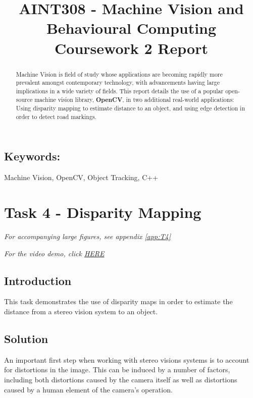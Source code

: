 \documentclass[conference]{IEEEtran}
\begin{document}
%
\title{AINT308 - Machine Vision and Behavioural Computing\\Coursework 2 Report}


\author{
}



\maketitle


\begin{abstract}
 Machine Vision is field of study whose applications are becoming rapidly more prevalent amongst contemporary technology, with advancements having large implications in a wide variety of fields. This report details the use of a popular open-source machine vision library, \textbf{OpenCV}, in two additional real-world applications: Using disparity mapping to estimate distance to an object, and using edge detection in order to detect road markings.
\end{abstract}
\subsection*{Keywords:}
Machine Vision, OpenCV, Object Tracking, C++

\section{Task 4 - Disparity Mapping}
\textit{For accompanying large figures, see appendix \ref{app:T4}}

\textit{For the video demo, click \href{https://youtu.be/d2Wa1JnRzoY}{HERE}}
\subsection{Introduction}
This task demonstrates the use of disparity maps in order to estimate the distance from a stereo vision system to an object.
\subsection{Solution}
An important first step when working with stereo visions systems is to account for distortions in the image. This can be induced by a number of factors, including both distortions caused by the camera itself as well as distortions caused by a human element of the camera's operation\cite{Distortions}.
\end{document}
